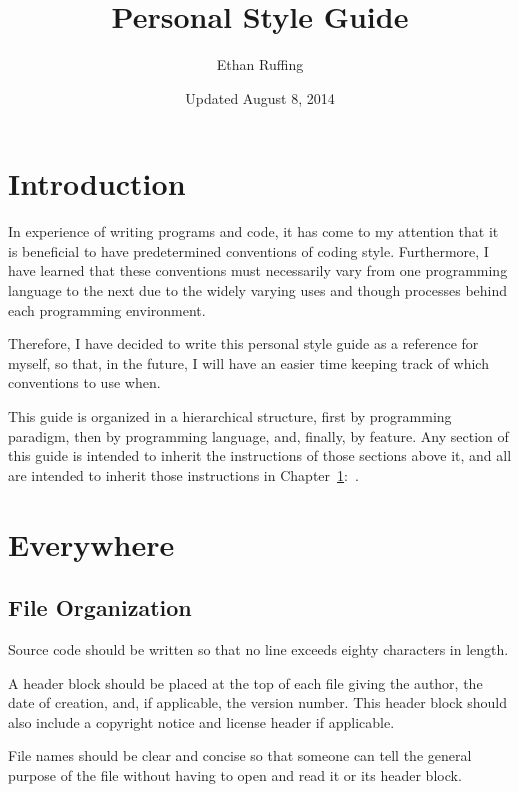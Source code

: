 \documentclass[12pt,letter]{memoir} %
\title{Personal Style Guide}
\author{Ethan Ruffing}
\date{Updated August 8, 2014} %
\begin{document}
\maketitle
\thispagestyle{plainnotice}


\clearpage\mbox{}\thispagestyle{empty}\clearpage

\tableofcontents*

\newpage
\thispagestyle{empty}
\mbox{}

\chapter*{Introduction}
In experience of writing programs and code, it has come to my attention that it
is beneficial to have predetermined conventions of coding style. Furthermore, I
have learned that these conventions must necessarily vary from one programming
language to the next due to the widely varying uses and though processes behind
each programming environment.

Therefore, I have decided to write this personal style guide as a reference for
myself, so that, in the future, I will have an easier time keeping track of
which conventions to use when.

This guide is organized in a hierarchical structure, first by programming
paradigm, then by programming language, and, finally, by feature. Any section of
this guide is intended to inherit the instructions of those sections above it,
and all are intended to inherit those instructions in
Chapter~\ref{chap:everywhere}:~.

\chapter{Everywhere}\label{chap:everywhere}
	\section{File Organization}
		Source code should be written so that no line exceeds eighty characters
		in length.
		
		A header block should be placed at the top of each file giving the
		author, the date of creation, and, if applicable, the version number.
		This header block should also include a copyright notice and license
		header if applicable.
		
		File names should be clear and concise so that someone can tell the
		general purpose of the file without having to open and read it or its
		header block.
\end{document}
